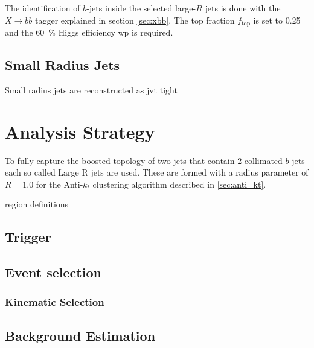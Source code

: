 
The identification of $b$-jets inside the selected large-$R$ jets is done with the $X\rightarrow bb$ tagger explained in section \ref{sec:xbb}. The top fraction $f_\text{top}$ is set to 0.25 and the \qty[]{60}{\percent} Higgs efficiency \ac{wp} is required.

\subsection{Small Radius Jets}
Small radius jets are reconstructed as 
jvt tight 


\section{Analysis Strategy}
To fully capture the boosted topology of two jets that contain 2 collimated $b$-jets each so called Large R jets are used. These are formed with a radius parameter of $R=1.0$ for the Anti-$k_t$ clustering algorithm described in \ref{sec:anti_kt}.

region definitions
\subsection{Trigger}
\subsection{Event selection}
\subsubsection{Kinematic Selection}
\subsection{Background Estimation}

